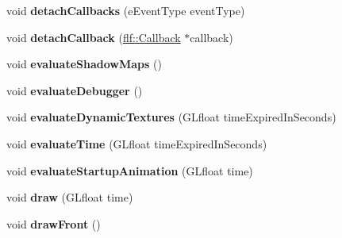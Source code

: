 \begin{DoxyCompactItemize}
\item 
void {\bfseries detach\+Callbacks} (e\+Event\+Type event\+Type)\hypertarget{structflw_1_1Engine_1_1EngineImpl_a1ff557b241bffdeb26c6153fed625b7b}{}\label{structflw_1_1Engine_1_1EngineImpl_a1ff557b241bffdeb26c6153fed625b7b}

\item 
void {\bfseries detach\+Callback} (\hyperlink{classflw_1_1flf_1_1Callback}{flf\+::\+Callback} $\ast$callback)\hypertarget{structflw_1_1Engine_1_1EngineImpl_aead7a1991585ec3d8f6445e484810c8f}{}\label{structflw_1_1Engine_1_1EngineImpl_aead7a1991585ec3d8f6445e484810c8f}

\item 
void {\bfseries evaluate\+Shadow\+Maps} ()\hypertarget{structflw_1_1Engine_1_1EngineImpl_a15b4df4f32dea9d6f177c1c7e6d5c07c}{}\label{structflw_1_1Engine_1_1EngineImpl_a15b4df4f32dea9d6f177c1c7e6d5c07c}

\item 
void {\bfseries evaluate\+Debugger} ()\hypertarget{structflw_1_1Engine_1_1EngineImpl_a91a3eb8c74c7ddb5dc8b6c61224d3a22}{}\label{structflw_1_1Engine_1_1EngineImpl_a91a3eb8c74c7ddb5dc8b6c61224d3a22}

\item 
void {\bfseries evaluate\+Dynamic\+Textures} (G\+Lfloat time\+Expired\+In\+Seconds)\hypertarget{structflw_1_1Engine_1_1EngineImpl_aa7e908856cc0a5a3356c40c10091db64}{}\label{structflw_1_1Engine_1_1EngineImpl_aa7e908856cc0a5a3356c40c10091db64}

\item 
void {\bfseries evaluate\+Time} (G\+Lfloat time\+Expired\+In\+Seconds)\hypertarget{structflw_1_1Engine_1_1EngineImpl_af5b5a4401b9e6a1cc5e6f2e1748dd269}{}\label{structflw_1_1Engine_1_1EngineImpl_af5b5a4401b9e6a1cc5e6f2e1748dd269}

\item 
void {\bfseries evaluate\+Startup\+Animation} (G\+Lfloat time)\hypertarget{structflw_1_1Engine_1_1EngineImpl_aaeac74a253101e6f085752641b8b7501}{}\label{structflw_1_1Engine_1_1EngineImpl_aaeac74a253101e6f085752641b8b7501}

\item 
void {\bfseries draw} (G\+Lfloat time)\hypertarget{structflw_1_1Engine_1_1EngineImpl_a9f91dee83c906b0940d8156e3800e120}{}\label{structflw_1_1Engine_1_1EngineImpl_a9f91dee83c906b0940d8156e3800e120}

\item 
void {\bfseries draw\+Front} ()\hypertarget{structflw_1_1Engine_1_1EngineImpl_a329502c8752b2e68914f84a80ef841d8}{}\label{structflw_1_1Engine_1_1EngineImpl_a329502c8752b2e68914f84a80ef841d8}


\end{DoxyCompactItemize}
